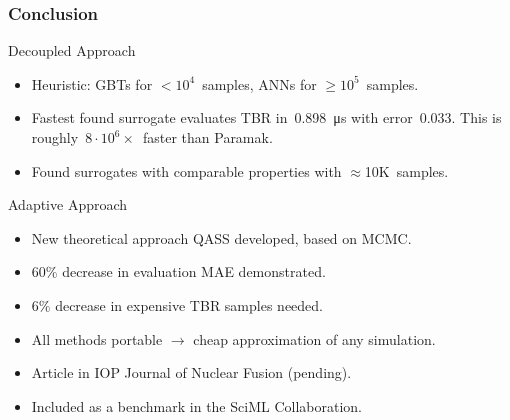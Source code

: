 \begin{frame}
	\frametitle{Conclusion}

	\begin{block}{Decoupled Approach}
		\begin{itemize}
			\setlength\itemsep{0em}
			\item
				Heuristic: \alert{GBTs} for $<10^4$~samples,
				\alert{ANNs} for $\geq10^5$~samples.
			\item
				Fastest found surrogate evaluates TBR in~\SI{0.898}{\micro\second}
				with error~$\num{0.033}$. This is roughly~\alert{$8\cdot
				10^6\times$~faster} than Paramak.
			\item
				Found surrogates with comparable properties with
				\alert{$\approx$10K~samples}.
		\end{itemize}
	\end{block}

	\begin{block}{Adaptive Approach}
		\begin{itemize}
			\setlength\itemsep{0em}
			\item
				New theoretical approach \alert{QASS} developed, based on MCMC.
			\item 
				\alert{$60\%$ decrease} in evaluation MAE demonstrated.
			\item
				\alert{$6\%$ decrease} in expensive TBR samples needed.
		\end{itemize}
	\end{block}

	\begin{itemize}
		\item 
			All methods \alert{portable} $\rightarrow$ cheap approximation of any simulation.
		\item
			Article in IOP \alert{Journal of Nuclear Fusion} (pending).
		\item
			Included as a benchmark in the \alert{SciML Collaboration}.
	\end{itemize}

\end{frame}

